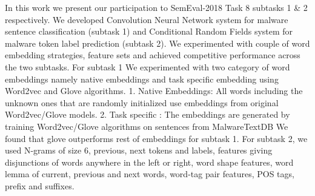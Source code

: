 In this work we present our participation to SemEval-2018 Task 8 subtasks 1 \& 2 respectively. We developed Convolution Neural Network system for malware sentence classification (subtask 1) and Conditional Random Fields system for malware token label prediction (subtask 2). We experimented with couple of word embedding strategies, feature sets and achieved competitive performance across the two subtasks. For subtask 1 We experimented with two category of word embeddings namely native embeddings and task specific embedding using Word2vec and Glove algorithms. 1. Native Embeddings: All words including the unknown ones that are randomly initialized use embeddings from original Word2vec/Glove models. 2. Task specific : The embeddings are generated by training Word2vec/Glove algorithms on sentences from MalwareTextDB We found that glove outperforms rest of embeddings for subtask 1. For subtask 2, we used N-grams of size 6, previous, next tokens and labels, features giving disjunctions of words anywhere in the left or right, word shape features, word lemma of current, previous and next words, word-tag pair features, POS tags, prefix and suffixes.

